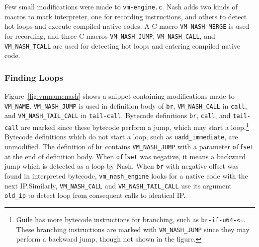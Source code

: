\documentclass[preprint, 10pt]{sigplanconf}
\begin{document}
Few small modifications were made to \texttt{vm-engine.c}. Nash adds two kinds
of macros to mark interpreter, one for recording instructions, and others to
detect hot loops and execute compiled native codes. A C macro
\texttt{VM\_NASH\_MERGE} is used for recording, and three C macros
\texttt{VM\_NASH\_JUMP}, \texttt{VM\_NASH\_CALL}, and \texttt{VM\_NASH\_TCALL}
are used for detecting hot loops and entering compiled native code.

\subsubsection{Finding Loops}

Figure~\hyperref[fig:vmnamenash]{\ref{fig:vmnamenash}} shows a snippet
containing modifications made to \texttt{VM\_NAME}. \texttt{VM\_NASH\_JUMP} is
used in definition body of \texttt{br}, \texttt{VM\_NASH\_CALL} in
\texttt{call}, and \texttt{VM\_NASH\_TAIL\_CALL} in \texttt{tail-call}. Bytecode
definitions \texttt{br}, \texttt{call}, and \texttt{tail-call} are marked since
these bytecode perform a jump, which may start a loop.\footnote{Guile has more
  bytecode instructions for branching, such as \texttt{br-if-u64-<=}. These
  branching instructions are marked with \texttt{VM\_NASH\_JUMP} since they may
  perform a backward jump, though not shown in the figure.}  Bytecode
definitions which do not start a loop, such as \texttt{uadd\_immediate}, are
unmodified. The definition of \texttt{br} contains \texttt{VM\_NASH\_JUMP} with
a parameter \texttt{offset} at the end of definition body. When \texttt{offset}
was negative, it means a backward jump which is detected as a loop by Nash. When
\texttt{br} with negative offset was found in interpreted bytecode,
\texttt{vm\_nash\_engine} looks for a native code with the next IP.\@ Similarly,
\texttt{VM\_NASH\_CALL} and \texttt{VM\_NASH\_TAIL\_CALL} use its argument
\texttt{old\_ip} to detect loop from consequent calls to identical IP.\@

\end{document}
